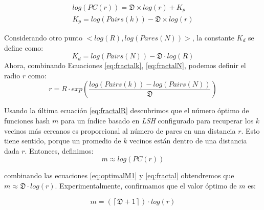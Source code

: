 
\begin{eqnarray}\label{eq:fractalk}
	   log(PC(r)) = \mathfrak{D} \times log (r) + K_p \nonumber\\
	   K_p   = log (Pairs (k)) - \mathfrak{D} \times log (r)
\end{eqnarray} 
	
Considerando otro punto $ <log(R), log(Pares(N))> $, la constante $ K_d $ se define como:
\begin{equation}\label{eq:fractalN}
    K_d    = log (Pairs(N)) - \mathfrak{D} \cdot log (R) 
\end{equation} 
Ahora, combinando Ecuaciones \ref{eq:fractalk}, \ref{eq:fractalN}, podemos definir el radio $r$ como:
\begin{equation}\label{eq:fractalR}
  r  =  R \cdot  exp (  \frac{log (Pairs (k)) - log (Pairs(N))}{ \mathfrak{D} } )    
\end{equation}
 
Usando la última ecuación \ref{eq:fractalR} descubrimos que el número óptimo de funciones hash $m$ para un índice basado en \textit{LSH} configurado para recuperar los $k$ vecinos más cercanos es proporcional al número de pares en una distancia $r$. Esto tiene sentido, porque un promedio de $k$ vecinos están dentro de una distancia dada $r$. Entonces, definimos:
\begin{equation}\label{eq:optimalM1}
   m \approx log (PC(r)) 
\end{equation}

combinando las ecuaciones \ref{eq:optimalM1} y \ref{eq:fractal} obtendremos que $m \approx \mathfrak{D} \cdot log (r)  $. Experimentalmente, confirmamos que el valor óptimo de $m$ es:

 \begin{equation}\label{eq:fractalm}
    m = (\left\lceil \mathfrak{D} + 1 \right\rceil  ) \cdot  log (r)
 \end{equation}


